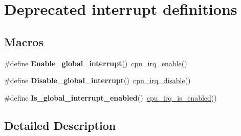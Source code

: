 \hypertarget{group__interrupt__deprecated__group}{\section{Deprecated interrupt definitions}
\label{group__interrupt__deprecated__group}
}
\subsection*{Macros}
\begin{DoxyCompactItemize}
\item 
\hypertarget{group__interrupt__deprecated__group_gaebdc47e7800e11d79b9e5e2da1fecaa6}{\#define {\bfseries Enable\-\_\-global\-\_\-interrupt}()~\hyperlink{group__interrupt__group_gae4922a4bd8ba4150211fbc7f2302403c}{cpu\-\_\-irq\-\_\-enable}()}\label{group__interrupt__deprecated__group_gaebdc47e7800e11d79b9e5e2da1fecaa6}

\item 
\hypertarget{group__interrupt__deprecated__group_ga4834270e1b8984fe025bce15e7ae1564}{\#define {\bfseries Disable\-\_\-global\-\_\-interrupt}()~\hyperlink{group__interrupt__group_ga7b77391ed86e2e027f9ee1dd99a06980}{cpu\-\_\-irq\-\_\-disable}()}\label{group__interrupt__deprecated__group_ga4834270e1b8984fe025bce15e7ae1564}

\item 
\hypertarget{group__interrupt__deprecated__group_gab7b13c60d26b190e73e540586f1868f8}{\#define {\bfseries Is\-\_\-global\-\_\-interrupt\-\_\-enabled}()~\hyperlink{group__interrupt__group_gae1545a2473614564550b9c4015c94978}{cpu\-\_\-irq\-\_\-is\-\_\-enabled}()}\label{group__interrupt__deprecated__group_gab7b13c60d26b190e73e540586f1868f8}

\end{DoxyCompactItemize}


\subsection{Detailed Description}
